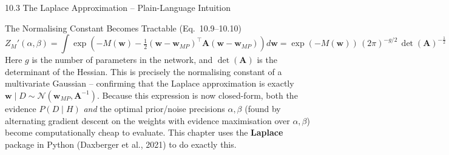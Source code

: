 \documentclass[aspectratio=169,10pt]{beamer}
\newcommand{\bw}{\mathbf{w}}
\begin{document}
\begin{frame}[allowframebreaks]{10.3 The Laplace Approximation -- Plain-Language Intuition}
  \begin{block}{The Normalising Constant Becomes Tractable (Eq.\ 10.9--10.10)}
    \[
      Z_M'(\alpha,\beta) = \int \exp\left(-M(\bw) -\tfrac{1}{2}(\bw-\bw_{MP})^\top
        \mathbf{A}(\bw-\bw_{MP})\right) d\bw
      = \exp(-M(\bw))\,(2\pi)^{-g/2}\,\det(\mathbf{A})^{-\frac{1}{2}}
    \]
    Here $g$ is the number of parameters in the network, and $\det(\mathbf{A})$
    is the determinant of the Hessian. This is precisely the normalising
    constant of a multivariate Gaussian -- confirming that the Laplace
    approximation is exactly $\bw \mid D \sim \mathcal{N}(\bw_{MP}, \mathbf{A}^{-1})$.
    Because this expression is now closed-form, both the evidence $P(D\mid H)$
    \emph{and} the optimal prior/noise precisions $\alpha,\beta$ (found by
    alternating gradient descent on the weights with evidence maximisation
    over $\alpha,\beta$) become computationally cheap to evaluate. This
    chapter uses the \textbf{Laplace} package in Python (Daxberger et al.,
    2021) to do exactly this.
  \end{block}

  \framebreak


\end{frame}
\end{document}
